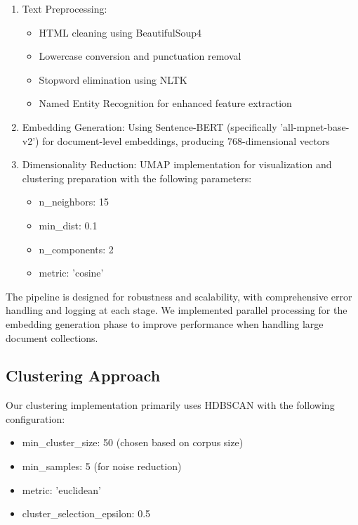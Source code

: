 \documentclass[conference]{IEEEtran}
\begin{document}
\begin{enumerate}
    \item Text Preprocessing: 
        \begin{itemize}
            \item HTML cleaning using BeautifulSoup4
            \item Lowercase conversion and punctuation removal
            \item Stopword elimination using NLTK
            \item Named Entity Recognition for enhanced feature extraction
        \end{itemize}
    \item Embedding Generation: Using Sentence-BERT \citep{reimers2019sentence} (specifically 'all-mpnet-base-v2') for document-level embeddings, producing 768-dimensional vectors
    \item Dimensionality Reduction: UMAP \citep{mcinnes2017umap} implementation for visualization and clustering preparation with the following parameters:
        \begin{itemize}
            \item n\_neighbors: 15
            \item min\_dist: 0.1
            \item n\_components: 2
            \item metric: 'cosine'
        \end{itemize}
\end{enumerate}

The pipeline is designed for robustness and scalability, with comprehensive error handling and logging at each stage. We implemented parallel processing for the embedding generation phase to improve performance when handling large document collections.

\subsection{Clustering Approach}
Our clustering implementation primarily uses HDBSCAN \citep{campello2013density} with the following configuration:
\begin{itemize}
    \item min\_cluster\_size: 50 (chosen based on corpus size)
    \item min\_samples: 5 (for noise reduction)
    \item metric: 'euclidean'
    \item cluster\_selection\_epsilon: 0.5
\end{itemize}
\end{document}
